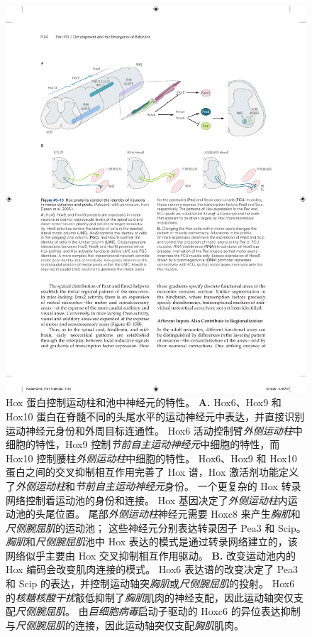 \begin{figure}[htbp]
	\centering
	\includegraphics[width=1.0\linewidth]{chap45/fig_45_13}
	\caption{Hox 蛋白控制运动柱和池中神经元的特性\cite{dasen2005hox}。
		\textbf{A.} Hox6、Hox9 和 Hox10 蛋白在脊髓不同的头尾水平的运动神经元中表达，并直接识别运动神经元身份和外周目标连通性。
		Hox6 活动控制臂\textit{外侧运动柱}中细胞的特性，Hox9 控制\textit{节前自主运动神经元}中细胞的特性，而 Hox10 控制腰柱\textit{外侧运动柱}中细胞的特性。
		Hox6、Hox9 和 Hox10 蛋白之间的交叉抑制相互作用完善了 Hox 谱，Hox 激活剂功能定义了\textit{外侧运动柱}和\textit{节前自主运动神经元}身份。
		一个更复杂的 Hox 转录网络控制着运动池的身份和连接。
		Hox 基因决定了\textit{外侧运动柱}内运动池的头尾位置。
		尾部\textit{外侧运动柱}神经元需要 Hoxc8 来产生\textit{胸肌}和\textit{尺侧腕屈肌}的运动池；
		这些神经元分别表达转录因子 Pea3 和 Scip。
		\textit{胸肌}和\textit{尺侧腕屈肌}池中 Hox 表达的模式是通过转录网络建立的，该网络似乎主要由 Hox 交叉抑制相互作用驱动。
		\textbf{B.} 改变运动池内的 Hox 编码会改变肌肉连接的模式。
		Hox6 表达谱的改变决定了 Pea3 和 Scip 的表达，并控制运动轴突\textit{胸肌}或\textit{尺侧腕屈肌}的投射。
		Hox6 的\textit{核糖核酸干扰}敲低抑制了\textit{胸肌}肌肉的神经支配，因此运动轴突仅支配\textit{尺侧腕屈肌}。
		由\textit{巨细胞病毒}启动子驱动的 Hoxc6 的异位表达抑制与\textit{尺侧腕屈肌}的连接，因此运动轴突仅支配\textit{胸肌}肌肉。}
	\label{fig:45_13}
\end{figure}



